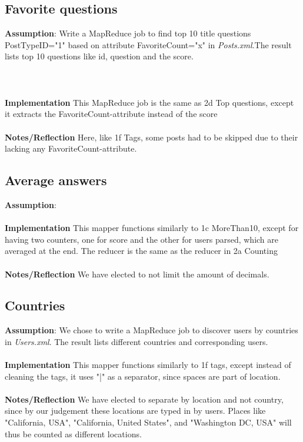 \documentclass[fleqn,10pt]{wlscirep}
\begin{document}
\subsection{Favorite questions }
\textbf{Assumption}: Write a MapReduce job to find top 10 title questions PostTypeID="1"  based on attribute FavoriteCount="x" in \textit{Posts.xml}.The result lists top 10 questions like id, question and the score.\\ \\ \\ \\
\textbf{Implementation} This MapReduce job is the same as 2d Top questions, except it extracts the FavoriteCount-attribute instead of the score \\ \\
\textbf{Notes/Reflection} Here, like 1f Tags, some posts had to be skipped due to their lacking any FavoriteCount-attribute.


\subsection{Average answers}
\textbf{Assumption}: \\ \\
\textbf{Implementation} This mapper functions similarly to  1c MoreThan10, except for having two counters, one for score and the other for users parsed, which are averaged at the end. The reducer is the same as the reducer in 2a Counting \\ \\
\textbf{Notes/Reflection} We have elected to not limit the amount of decimals.


\subsection{Countries}
\textbf{Assumption}: We chose to write a MapReduce job to discover users by countries in \textit{Users.xml}. The result lists different countries and corresponding users. \\ \\
\textbf{Implementation} This mapper functions similarly to 1f tags, except instead of cleaning the tags, it uses "|" as a separator, since spaces are part of location. \\ \\
\textbf{Notes/Reflection} We have elected to separate by location and not country, since by our judgement these locations are typed in by users. Places like "California, USA", "California, United States", and "Washington DC, USA" will thus be counted as different locations.

\end{document}
